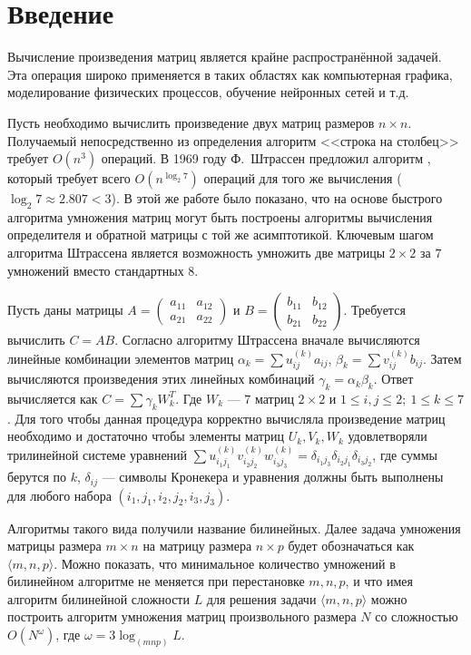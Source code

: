 \documentclass[12pt]{article}
\begin{document}
\cwPutTitleContents

\section{Введение}

Вычисление произведения матриц является крайне распространённой задачей.
Эта операция широко применяется в таких областях как компьютерная графика, моделирование физических процессов, обучение нейронных сетей и т.д.

Пусть необходимо вычислить произведение двух матриц размеров $n \times n$.
Получаемый непосредственно из определения алгоритм <<строка на столбец>> требует $O(n^3)$ операций.
В 1969 году Ф.~Штрассен предложил алгоритм \cite{S}, который требует всего $O(n^{\log_{2} 7})$ операций для того же вычисления
($\log_{2} 7 \approx 2.807 < 3$). В этой же работе было показано, что на основе быстрого алгоритма умножения матриц могут быть построены алгоритмы вычисления определителя и обратной матрицы с той же асимптотикой.
Ключевым шагом алгоритма Штрассена является возможность умножить две матрицы $2 \times 2$ за $7$ умножений вместо стандартных $8$.

Пусть даны матрицы
$A =
\begin{pmatrix}
a_{11} & a_{12} \\
a_{21} & a_{22}
\end{pmatrix}$ и
$B =
\begin{pmatrix}
b_{11} & b_{12} \\
b_{21} & b_{22}
\end{pmatrix}$.
Требуется вычислить $C = AB$. 
Согласно алгоритму Штрассена вначале вычисляются линейные комбинации элементов матриц $\alpha_k = \sum u^{(k)}_{ij} a_{ij}$,
$\beta_k = \sum v^{(k)}_{ij} b_{ij}$. Затем вычисляются произведения этих линейных комбинаций $\gamma_k = \alpha_k \beta_k$.
Ответ вычисляется как $C = \sum \gamma_k W_k^T$. Где $W_k$ --- $7$ матриц $2 \times 2$ и ${1 \leqslant i, j \leqslant 2;~ 1 \leqslant k \leqslant 7}$. 
Для того чтобы данная процедура корректно вычисляла произведение матриц необходимо и достаточно чтобы элементы матриц $U_k, V_k, W_k$ удовлетворяли трилинейной системе уравнений
$\sum u^{(k)}_{i_1j_1} v^{(k)}_{i_2j_2} w^{(k)}_{i_3j_3} = \delta_{i_1j_3} \delta_{i_2j_1} \delta_{i_3j_2}$, где суммы берутся по $k$, $\delta_{ij}$ --- символы Кронекера и уравнения должны быть выполнены для любого набора $(i_1, j_1, i_2, j_2, i_3, j_3)$.

Алгоритмы такого вида получили название билинейных. Далее задача умножения матрицы размера $m \times n$ на матрицу размера $n \times p$ будет обозначаться как $\langle m, n, p \rangle$. Можно показать, что минимальное количество умножений в билинейном алгоритме не меняется при перестановке $m, n, p$, и что имея алгоритм билинейной сложности $L$ для решения задачи $\langle m, n, p \rangle$ можно построить алгоритм умножения матриц произвольного размера $N$ со сложностью $O(N^\omega)$, где $\omega = 3 \log_{(mnp)}L$.
\end{document}
